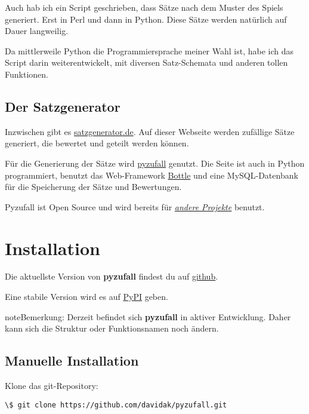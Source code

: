 \documentclass[a4paper,12pt,oneside]{sphinxmanual}
\begin{document}
Auch hab ich ein Script geschrieben, dass Sätze nach dem Muster des Spiels generiert. Erst in Perl und dann in Python. Diese Sätze werden natürlich auf Dauer langweilig.

Da mittlerweile Python die Programmiersprache meiner Wahl ist, habe ich das Script darin weiterentwickelt, mit diversen Satz-Schemata und anderen tollen Funktionen.


\section{Der Satzgenerator}
\label{entstehung:der-satzgenerator}
Inzwischen gibt es \href{http://satzgenerator.de/}{satzgenerator.de}. Auf dieser Webseite werden zufällige Sätze generiert, die bewertet und geteilt werden können.

Für die Generierung der Sätze wird \href{https://github.com/davidak/pyzufall}{pyzufall} genutzt. Die Seite ist auch in Python programmiert, benutzt das Web-Framework \href{http://bottlepy.org/}{Bottle} und eine MySQL-Datenbank für die Speicherung der Sätze und Bewertungen.

Pyzufall ist Open Source und wird bereits für {\hyperref[benutzer::doc]{\emph{andere Projekte}}} benutzt.


\chapter{Installation}
\label{installation:installation}\label{installation::doc}
Die aktuellste Version von \textbf{pyzufall} findest du auf \href{https://github.com/davidak/pyzufall}{github}.

Eine stabile Version wird es auf \href{https://pypi.python.org/}{PyPI} geben.

\begin{notice}{note}{Bemerkung:}
Derzeit befindet sich \textbf{pyzufall} in aktiver Entwicklung. Daher kann sich die Struktur oder Funktionsnamen noch ändern.
\end{notice}


\section{Manuelle Installation}
\label{installation:manuelle-installation}
Klone das git-Repository:

\begin{Verbatim}[commandchars=\\\{\}]
\$ git clone https://github.com/davidak/pyzufall.git
\end{Verbatim}
\end{document}
